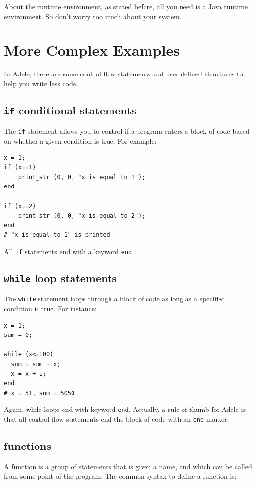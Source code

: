 \documentclass[11pt,letterpaper]{article}
\begin{document}
About the runtime environment, as stated before, all you need is a Java runtime environment. So don't worry too much about your system.

\section {More Complex Examples}
In Adele, there are some control flow statements and user defined structures to help you write less code.

\subsection {\texttt{if} conditional statements}

The \texttt{if} statement allows you to control if a program enters a block of code based on whether a given condition is true. For example:

\begin{lstlisting}[caption=if.adl, label=if, captionpos=b, tabsize=4, frame=single]
x = 1;
if (x==1)
	print_str (0, 0, "x is equal to 1");
end

if (x==2)
	print_str (0, 0, "x is equal to 2");
end
# "x is equal to 1" is printed
\end{lstlisting}

All \texttt{if} statements end with a keyword \texttt{end}.

\subsection {\texttt{while} loop statements}
The \texttt{while} statement loops through a block of code as long as a specified condition is true. For instance:

\begin{lstlisting}[caption=while.adl, label=while, captionpos=b, tabsize=4, frame=single]
x = 1;
sum = 0;

while (x<=100)
  sum = sum + x;
  x = x + 1;
end
# x = 51, sum = 5050
\end{lstlisting}

Again, while loops end with keyword \texttt{end}. Actually, a rule of thumb for Adele is that all control flow statements end the block of code with an \texttt{end} marker.

\subsection {functions}
A function is a group of statements that is given a name, and which can be called from some point of the program. The common syntax to define a function is:
\end{document}
